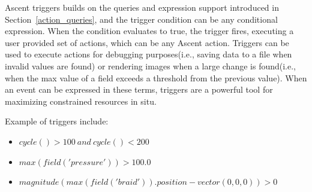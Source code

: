 Ascent triggers builds on the queries and expression support introduced in
Section~\ref{action_queries}, and the trigger condition can be any conditional
expression.
%
When the condition evaluates to true, the trigger fires, executing a user provided
set of actions, which can be any Ascent action.
%
Triggers can be used to execute actions for debugging purposes(i.e., saving data to
a file when invalid values are found) or rendering images when a large
change is found(i.e., when the max value of a field exceeds a threshold from the
previous value).
%
When an event can be expressed in these terms, triggers are a powerful tool for
maximizing constrained resources in situ.

Example of triggers include:
\begin{itemize}
\item $cycle() > 100 \ and \ cycle() < 200$
\item $max(field('pressure')) > 100.0$
\item $magnitude(max(field('braid')).position - vector(0,0,0)) > 0$
\end{itemize}
